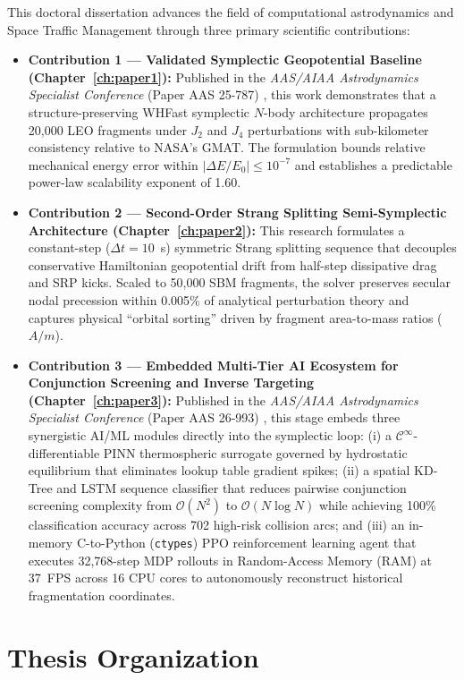 This doctoral dissertation advances the field of computational astrodynamics and Space Traffic Management through three primary scientific contributions:
\begin{itemize}
    \item \textbf{Contribution 1 --- Validated Symplectic Geopotential Baseline (Chapter~\ref{ch:paper1}):} Published in the \textit{AAS/AIAA Astrodynamics Specialist Conference} (Paper AAS 25-787) \cite{puerta-ibarra_aas25_2025}, this work demonstrates that a structure-preserving WHFast symplectic $N$-body architecture propagates 20,000 LEO fragments under $J_2$ and $J_4$ perturbations with sub-kilometer consistency relative to NASA's GMAT. The formulation bounds relative mechanical energy error within $|\Delta E/E_0| \le 10^{-7}$ and establishes a predictable power-law scalability exponent of 1.60.
    \item \textbf{Contribution 2 --- Second-Order Strang Splitting Semi-Symplectic Architecture (Chapter~\ref{ch:paper2}):} This research formulates a constant-step ($\Delta t = 10$~s) symmetric Strang splitting sequence that decouples conservative Hamiltonian geopotential drift from half-step dissipative drag and SRP kicks. Scaled to 50,000 SBM fragments, the solver preserves secular nodal precession within 0.005\% of analytical perturbation theory and captures physical ``orbital sorting'' driven by fragment area-to-mass ratios ($A/m$).
    \item \textbf{Contribution 3 --- Embedded Multi-Tier AI Ecosystem for Conjunction Screening and Inverse Targeting (Chapter~\ref{ch:paper3}):} Published in the \textit{AAS/AIAA Astrodynamics Specialist Conference} (Paper AAS 26-993) \cite{puerta-ibarra_aas26_2026}, this stage embeds three synergistic AI/ML modules directly into the symplectic loop: (i) a $\mathcal{C}^\infty$-differentiable PINN thermospheric surrogate governed by hydrostatic equilibrium that eliminates lookup table gradient spikes; (ii) a spatial KD-Tree and LSTM sequence classifier that reduces pairwise conjunction screening complexity from $\mathcal{O}(N^2)$ to $\mathcal{O}(N \log N)$ while achieving 100\% classification accuracy across 702 high-risk collision arcs; and (iii) an in-memory C-to-Python (\texttt{ctypes}) PPO reinforcement learning agent that executes 32,768-step MDP rollouts in Random-Access Memory (RAM) at 37~FPS across 16 CPU cores to autonomously reconstruct historical fragmentation coordinates.
\end{itemize}

\section{Thesis Organization}
\label{sec:organization}

